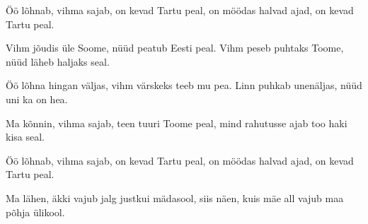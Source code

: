 

\beginverse*
Öö lõhnab, vihma sajab, 
on kevad Tartu peal, 
on möödas halvad ajad, 
on kevad Tartu peal. 
\endverse

\beginchorus
Vihm jõudis üle Soome, 
nüüd peatub Eesti peal. 
Vihm peseb puhtaks Toome, 
nüüd läheb haljaks seal. 
\endchorus

\beginverse*
Öö lõhna hingan väljas, 
vihm värskeks teeb mu pea. 
Linn puhkab unenäljas, 
nüüd uni ka on hea. 
\endverse

\beginchorus
Ma kõnnin, vihma sajab, 
teen tuuri Toome peal, 
mind rahutusse ajab 
too haki kisa seal.

Öö lõhnab, vihma sajab,  
on kevad Tartu peal,
on möödas halvad ajad, 
on kevad Tartu peal. 
\endchorus

\beginverse*
Ma lähen, äkki vajub 
jalg justkui mädasool, 
siis näen, kuis mäe all vajub 
maa põhja ülikool.
\endverse

\endsong
